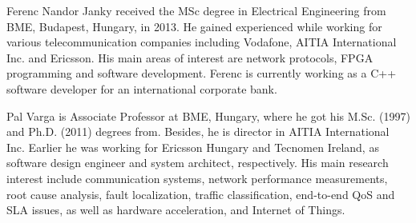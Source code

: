 \documentclass[journal]{IEEEtran}
\begin{document}
\begin{IEEEbiography}{Ferenc Nandor Janky} 
received the MSc degree in Electrical Engineering from BME, Budapest, Hungary, in 2013.
He gained experienced while working for various telecommunication companies including Vodafone, AITIA International Inc. and Ericsson.
His main areas of interest are network protocols, FPGA programming and software development. 
Ferenc is currently working as a C++ software developer for an international corporate bank.
\end{IEEEbiography}


\begin{IEEEbiography}{Pal Varga}
 is Associate Professor at BME, Hungary, where he got his M.Sc. (1997) and Ph.D. (2011) degrees from. Besides, he is director in AITIA International Inc. Earlier he was working for Ericsson Hungary and Tecnomen Ireland, as software design engineer and system architect, respectively. His main research interest include communication systems, network performance measurements, root cause analysis, fault localization, traffic classification, end-to-end QoS and SLA issues, as well as hardware acceleration, and Internet of Things.

\end{IEEEbiography}




%
%

%

%
%
\end{document}
